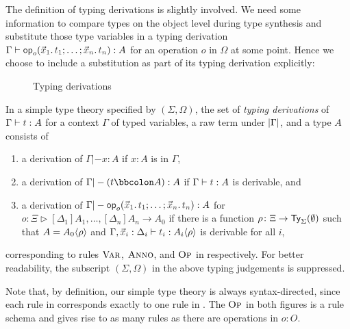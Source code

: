 The definition of typing derivations is slightly involved.
We need some information to compare types on the object level during type synthesis and substitute those type variables in a typing derivation $\Gamma \vdash \tmOpts : A$ for an operation $o$ in $\Omega$ at some point.
Hence we choose to include a substitution as part of its typing derivation explicitly:
\begin{definition}\label{def:typing-derivations}
  \begin{figure}
    \centering
    \small
    \caption{Typing derivations}
    \label{fig:extrinsic-typing}
  \end{figure}
  In a simple type theory specified by $(\Sigma, \Omega)$, the set of \emph{typing derivations} of $\Gamma \vdash \isTerm{t} : A$ for a context $\Gamma$ of typed variables, a raw term under $\left|\Gamma\right|$, and a type $A$ consists of 
  \begin{enumerate}
    \item a derivation of $\Gamma |- x : A$ if $x : A$ is in $\Gamma$,
    \item a derivation of $\Gamma |- (t \annotate A) : A$ if $\Gamma \vdash \isTerm{t} : A$ is derivable, and
    \item a derivation of $\Gamma |- \tmOpts : A$ for $o \colon \Xi \rhd [\Delta_1]A_1, \ldots, [\Delta_{n}]A_{n} \to A_0$ if there is a function $\rho\colon \Xi \to \mathsf{Ty}_{\Sigma}(\emptyset)$ such that $A = {A_0}\!\left<{\rho}\right>$ and $\Gamma, \vars{x}_{\isTerm{i}} : \Delta_i \vdash \isTerm{t_i} : \simsub{A_i}{\rho}$ is derivable for all $i$,
  \end{enumerate}
  corresponding to rules $\textnormal{\textsc{Var}}$, $\textnormal{\textsc{Anno}}$, and $\textnormal{\textsc{Op}}$ in  respectively.
  For better readability, the subscript $(\Sigma, \Omega)$ in the above typing judgements is suppressed.
\end{definition}
Note that, by definition, our simple type theory is always syntax-directed, since each rule in  corresponds exactly to one rule in . 
The $\textnormal{\textsc{Op}}$ in both figures is a rule schema and gives rise to as many rules as there are operations in $o : O$.

